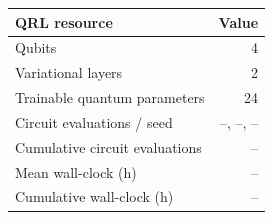 \begin{tabular}{lr}
\toprule
QRL resource & Value \\
\midrule
Qubits & 4 \\
Variational layers & 2 \\
Trainable quantum parameters & 24 \\
Circuit evaluations / seed & --, --, -- \\
Cumulative circuit evaluations & -- \\
Mean wall-clock (h) & -- \\
Cumulative wall-clock (h) & -- \\
\bottomrule
\end{tabular}
